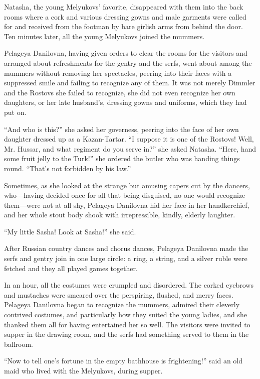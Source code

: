 Natasha, the young Melyukovs' favorite, disappeared with them
into the back rooms where a cork and various dressing gowns and
male garments were called for and received from the footman by
bare girlish arms from behind the door. Ten minutes later, all
the young Melyukovs joined the mummers.

Pelageya Danilovna, having given orders to clear the rooms for
the visitors and arranged about refreshments for the gentry and
the serfs, went about among the mummers without removing her
spectacles, peering into their faces with a suppressed smile and
failing to recognize any of them. It was not merely Dimmler and
the Rostovs she failed to recognize, she did not even recognize
her own daughters, or her late husband's, dressing gowns and
uniforms, which they had put on.

``And who is this?'' she asked her governess, peering into the
face of her own daughter dressed up as a Kazan-Tartar. ``I
suppose it is one of the Rostovs! Well, Mr. Hussar, and what
regiment do you serve in?'' she asked Natasha. ``Here, hand some
fruit jelly to the Turk!'' she ordered the butler who was handing
things round. ``That's not forbidden by his law.''

Sometimes, as she looked at the strange but amusing capers cut by
the dancers, who---having decided once for all that being
disguised, no one would recognize them---were not at all shy,
Pelageya Danilovna hid her face in her handkerchief, and her
whole stout body shook with irrepressible, kindly, elderly
laughter.

``My little Sasha! Look at Sasha!'' she said.

After Russian country dances and chorus dances, Pelageya
Danilovna made the serfs and gentry join in one large circle: a
ring, a string, and a silver ruble were fetched and they all
played games together.

In an hour, all the costumes were crumpled and disordered. The
corked eyebrows and mustaches were smeared over the perspiring,
flushed, and merry faces. Pelageya Danilovna began to recognize
the mummers, admired their cleverly contrived costumes, and
particularly how they suited the young ladies, and she thanked
them all for having entertained her so well. The visitors were
invited to supper in the drawing room, and the serfs had
something served to them in the ballroom.

``Now to tell one's fortune in the empty bathhouse is
frightening!'' said an old maid who lived with the Melyukovs,
during supper.

